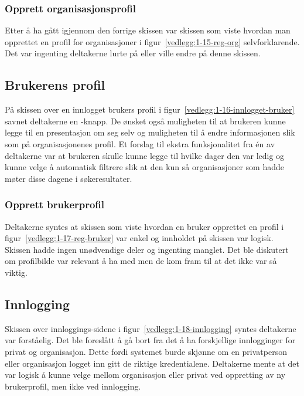 \subsubsection{Opprett organisasjonsprofil}

Etter å ha gått igjennom den forrige skissen var skissen som viste hvordan man opprettet en profil for organisasjoner i figur~\ref{vedlegg:1-15-reg-org} selvforklarende. Det var ingenting deltakerne lurte på eller ville endre på denne skissen.

\subsection{Brukerens profil}

På skissen over en innlogget brukers profil i figur~\ref{vedlegg:1-16-innlogget-bruker} savnet deltakerne en -knapp. De ønsket også muligheten til at brukeren kunne legge til en presentasjon om seg selv og muligheten til å endre informasjonen slik som på organisasjonenes profil. Et forslag til ekstra funksjonalitet fra én av deltakerne var at brukeren skulle kunne legge til hvilke dager den var ledig og kunne velge å automatisk filtrere slik at den kun så organisasjoner som hadde møter disse dagene i søkeresultater.


\subsubsection{Opprett brukerprofil}

Deltakerne syntes at skissen som viste hvordan en bruker opprettet en profil i figur~\ref{vedlegg:1-17-reg-bruker} var enkel og innholdet på skissen var logisk. Skissen hadde ingen unødvendige deler og ingenting manglet. Det ble diskutert om profilbilde var relevant å ha med men de kom fram til at det ikke var så viktig. 


\subsection{Innlogging}

Skissen over innloggings-sidene i figur~\ref{vedlegg:1-18-innlogging} syntes deltakerne var forståelig. Det ble foreslått å gå bort fra det å ha forskjellige innlogginger for privat og organisasjon. Dette fordi systemet burde skjønne om en privatperson eller organisasjon logget inn gitt de riktige kredentialene. Deltakerne mente at det var logisk å kunne velge mellom organisasjon eller privat ved oppretting av ny brukerprofil, men ikke ved innlogging.



